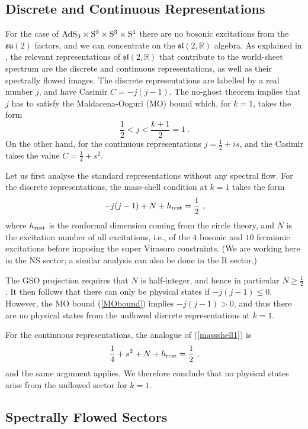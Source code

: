 \documentclass[12pt,a4paper]{article}
\newcommand{\be}{ \begin{equation}}
\newcommand{\ee}{\end{equation}}
\begin{document}
\subsection{Discrete and Continuous Representations}

For the case of ${\rm AdS}_3\times {\rm S}^3 \times {\rm S}^3 \times {\rm S}^1$ there are no bosonic excitations from the $\mathfrak{su}(2)$ factors, and we can concentrate on the $\mathfrak{sl}(2,\mathbb{R})$ algebra. As explained in \cite{Maldacena:2000hw}, the relevant representations of  $\mathfrak{sl}(2,\mathbb{R})$ that contribute to the world-sheet spectrum are the discrete and continuous representations, as well as their spectrally flowed images. The discrete representations are labelled by a real number $j$, and have Casimir $C = - j (j-1)$. The no-ghost theorem implies that $j$ has to satisfy the Maldacena-Ooguri (MO) bound \cite{Maldacena:2000hw} which, for $k=1$, takes the form 
\be\label{MObound}
\frac{1}{2} < j  < \frac{k+1}{2} = 1 \ . 
\ee
On the other hand, for the continuous representations $j=\frac{1}{2} + is$, and the Casimir takes the value $C = \frac{1}{4} + s^2$. 

Let us first analyse the standard representations without any spectral flow. For the discrete representations, the mass-shell condition at $k=1$ takes the form 
\be\label{massshell1}
- j (j-1) + N + h_{\rm rest} = \frac{1}{2} \ , 
\ee
where $h_{\rm rest}$ is the conformal dimension coming from the circle theory, and $N$ is the excitation number of all excitations, i.e., of the $4$ bosonic and $10$ fermionic excitations before imposing the super Virasoro constraints. (We are working here in the NS sector; a similar analysis can also be done in the R sector.)

The GSO projection requires that $N$ is half-integer, and hence in particular $N\geq \frac{1}{2}$. It then follows that there can only be physical states if $-j(j-1)\leq 0$. However, the MO bound (\ref{MObound}) implies $-j(j-1)>0$, and thus there are no physical states from the unflowed discrete representations at $k=1$.

For the continuous representations, the analogue of (\ref{massshell1}) is
\be
\frac{1}{4} + s^2 + N + h_{\rm rest} = \frac{1}{2} \ , 
\ee
and the same argument applies. We therefore conclude that no physical states arise from the unflowed sector for $k=1$. 


\subsection{Spectrally Flowed Sectors}\label{sec:2.2}
\end{document}
